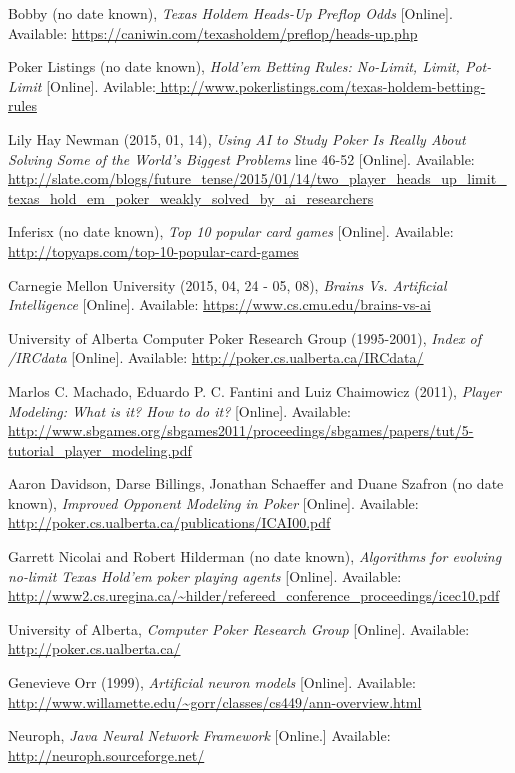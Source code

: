 \begin{thebibliography}{100} 
 Bobby (no date known), \emph{Texas Holdem Heads-Up Preflop Odds} [Online]. Available: \url{https://caniwin.com/texasholdem/preflop/heads-up.php}

 Poker Listings (no date known), \emph {Hold'em Betting Rules: No-Limit, Limit, Pot-Limit} [Online]. Avilable:\url{ http://www.pokerlistings.com/texas-holdem-betting-rules}


 Lily Hay Newman (2015, 01, 14), \emph{Using AI to Study Poker Is Really About Solving Some of the World’s Biggest Problems} line 46-52 [Online]. Available: \url{http://slate.com/blogs/future_tense/2015/01/14/two_player_heads_up_limit_texas_hold_em_poker_weakly_solved_by_ai_researchers}


 Inferisx (no date known), \emph{ Top 10 popular card games} [Online]. Available: \url{http://topyaps.com/top-10-popular-card-games}

 Carnegie Mellon University (2015, 04, 24 - 05, 08), \emph{Brains Vs. Artificial Intelligence} [Online]. Available: \url{https://www.cs.cmu.edu/brains-vs-ai}


 University of Alberta Computer Poker Research Group (1995-2001), \emph{Index of /IRCdata} [Online]. Available: \url{http://poker.cs.ualberta.ca/IRCdata/}


 Marlos C. Machado, Eduardo P. C. Fantini and Luiz Chaimowicz (2011), \emph{Player Modeling: What is it? How to do it?} [Online]. Available: \url{http://www.sbgames.org/sbgames2011/proceedings/sbgames/papers/tut/5-tutorial_player_modeling.pdf}


 Aaron Davidson, Darse Billings, Jonathan Schaeffer and Duane Szafron (no date known), \emph{Improved Opponent Modeling in Poker} [Online]. Available: \url{http://poker.cs.ualberta.ca/publications/ICAI00.pdf}


 Garrett Nicolai and Robert Hilderman (no date known), \emph{Algorithms for evolving no-limit Texas Hold'em poker playing agents} [Online]. Available: \url{http://www2.cs.uregina.ca/~hilder/refereed_conference_proceedings/icec10.pdf}


 University of Alberta, \emph{Computer Poker Research Group} [Online]. Available: \url{http://poker.cs.ualberta.ca/}

 Genevieve Orr (1999), \emph{ Artificial neuron models} [Online]. Available: \url{http://www.willamette.edu/~gorr/classes/cs449/ann-overview.html}

 Neuroph, \emph{Java Neural Network Framework} [Online.] Available: \url{http://neuroph.sourceforge.net/}


\end{thebibliography}